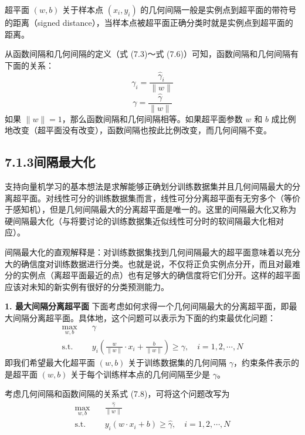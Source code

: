 \documentclass[UTF8, 12pt, fontset=fandol, oneside]{ctexart}
\begin{document}
超平面 $(w,b)$ 关于样本点 $(x_i,y_i)$ 的几何间隔一般是实例点到超平面的带符号的距离（signed distance），当样本点被超平面正确分类时就是实例点到超平面的距离。

从函数间隔和几何间隔的定义（式 (7.3)～式 (7.6)）可知，函数间隔和几何间隔有下面的关系：
\begin{equation}
\gamma_i=\frac{\hat{\gamma}_i}{\|w\|}
\tag{7.7}
\end{equation}
\begin{equation}
\gamma=\frac{\hat{\gamma}}{\|w\|}
\tag{7.8}
\end{equation}
如果 $\|w\|=1$，那么函数间隔和几何间隔相等。如果超平面参数 $w$ 和 $b$ 成比例地改变（超平面没有改变），函数间隔也按此比例改变，而几何间隔不变。

\subsection*{7.1.3\quad 间隔最大化}

支持向量机学习的基本想法是求解能够正确划分训练数据集并且几何间隔最大的分离超平面。对线性可分的训练数据集而言，线性可分分离超平面有无穷多个（等价于感知机），但是几何间隔最大的分离超平面是唯一的。这里的间隔最大化又称为硬间隔最大化（与将要讨论的训练数据集近似线性可分时的软间隔最大化相对应）。

间隔最大化的直观解释是：对训练数据集找到几何间隔最大的超平面意味着以充分大的确信度对训练数据进行分类。也就是说，不仅将正负实例点分开，而且对最难分的实例点（离超平面最近的点）也有足够大的确信度将它们分开。这样的超平面应该对未知的新实例有很好的分类预测能力。

\noindent\textbf{1. 最大间隔分离超平面}\quad
下面考虑如何求得一个几何间隔最大的分离超平面，即最大间隔分离超平面。具体地，这个问题可以表示为下面的约束最优化问题：
\begin{equation}
\begin{aligned}
\max_{w,b}\quad & \gamma\\
\mathrm{s.t.}\quad & y_i\left(\frac{w}{\|w\|}\cdot x_i+\frac{b}{\|w\|}\right)\geq \gamma,\quad i=1,2,\cdots,N
\end{aligned}
\tag{7.9--7.10}
\end{equation}
即我们希望最大化超平面 $(w,b)$ 关于训练数据集的几何间隔 $\gamma$，约束条件表示的是超平面 $(w,b)$ 关于每个训练样本点的几何间隔至少是 $\gamma$。

考虑几何间隔和函数间隔的关系式 (7.8)，可将这个问题改写为
\begin{equation}
\begin{aligned}
\max_{w,b}\quad & \frac{\hat{\gamma}}{\|w\|}\\
\mathrm{s.t.}\quad & y_i(w\cdot x_i+b)\geq \hat{\gamma},\quad i=1,2,\cdots,N
\end{aligned}
\tag{7.11--7.12}
\end{equation}
\end{document}
